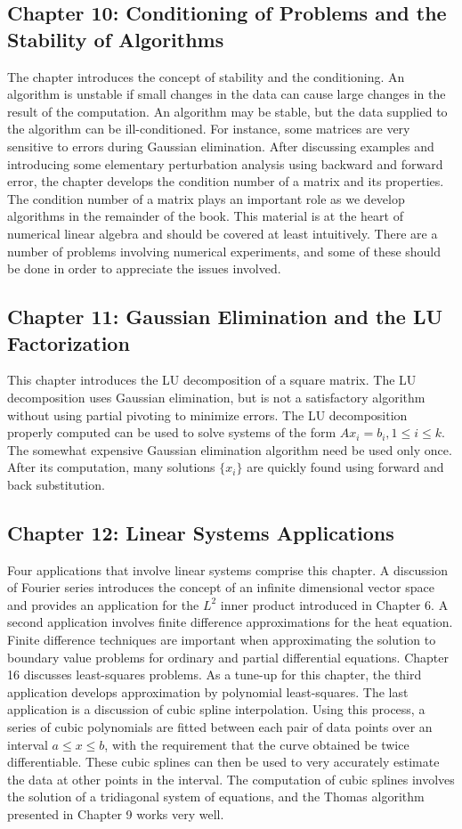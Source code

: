 \documentclass[../main.tex]{subfiles}
\begin{document}
\subsection*{Chapter 10: Conditioning of Problems and the Stability of Algorithms}
The chapter introduces the concept of stability and the conditioning. An algorithm is unstable if small changes in the data can cause large changes in the result of the computation. An algorithm may be stable, but the data supplied to the algorithm can be ill-conditioned. For instance, some matrices are very sensitive to errors during Gaussian elimination. After discussing examples and introducing some elementary perturbation analysis using backward and forward error, the chapter develops the condition number of a matrix and its properties. The condition number of a matrix plays an important role as we develop algorithms in the remainder of the book. This material is at the heart of numerical linear algebra and should be covered at least intuitively. There are a number of problems involving numerical experiments, and some of these should be done in order to appreciate the issues involved.

\subsection*{Chapter 11: Gaussian Elimination and the LU Factorization}
This chapter introduces the LU decomposition of a square matrix. The LU decomposition uses Gaussian elimination, but is not a satisfactory algorithm without using partial pivoting to minimize errors. The LU decomposition properly computed can be used to solve systems of the form $Ax_{i} = b_{i}, 1 \leq i \leq k$. The somewhat expensive Gaussian elimination algorithm need be used only once. After its computation, many solutions $\{x_{i}\}$ are quickly found using forward and back substitution.

\subsection*{Chapter 12: Linear Systems Applications}
Four applications that involve linear systems comprise this chapter. A discussion of Fourier series introduces the concept of an infinite dimensional vector space and provides an application for the $L^{2}$ inner product introduced in Chapter 6. A second application involves finite difference approximations for the heat equation. Finite difference techniques are important when approximating the solution to boundary value problems for ordinary and partial differential equations. Chapter 16 discusses least-squares problems. As a tune-up for this chapter, the third application develops approximation by polynomial least-squares. The last application is a discussion of cubic spline interpolation. Using this process, a series of cubic polynomials are fitted between each pair of data points over an interval $a \leq  x \leq  b$, with the requirement that the curve obtained be twice differentiable. These cubic splines can then be used to very accurately estimate the data at other points in the interval. The
computation of cubic splines involves the solution of a tridiagonal system of equations, and the Thomas algorithm presented in Chapter 9 works very well.
\end{document}
